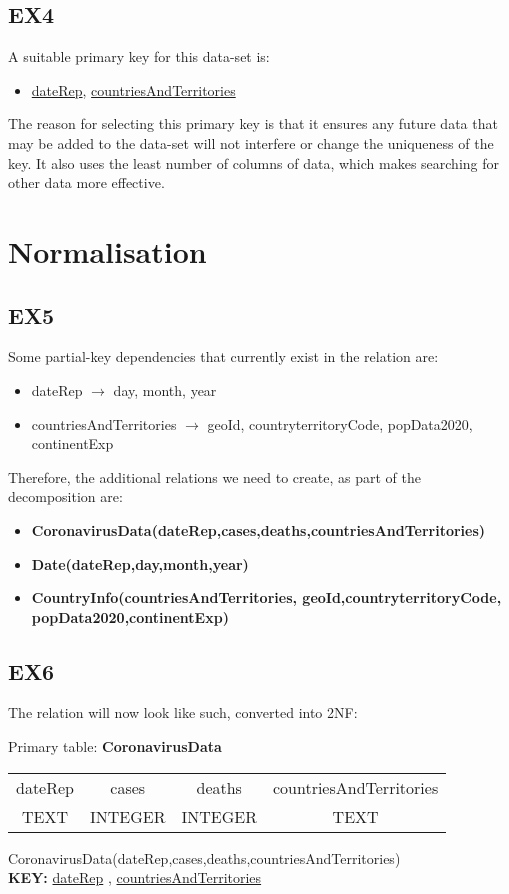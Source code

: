 \documentclass[10pt]{article}
\begin{document}
\subsection{EX4}
A suitable primary key for this data-set is:
\begin{itemize}
    \item \underline{dateRep}, \underline{countriesAndTerritories}  %
\end{itemize}
The reason for selecting this primary key is that it ensures any future data that may be added to the data-set will not interfere or change the uniqueness of the key. It also uses the least number of columns of data, which makes searching for other data more effective.

\section{Normalisation}
\subsection{EX5}
Some partial-key dependencies that currently exist in the relation are:
\begin{itemize}
    \item dateRep $\rightarrow$ day, month, year
    \item countriesAndTerritories $\rightarrow$ geoId, countryterritoryCode, popData2020, continentExp
\end{itemize}
Therefore, the additional relations we need to create, as part of the decomposition are:
\begin{itemize}
    \item \textbf{CoronavirusData(dateRep,cases,deaths,countriesAndTerritories)}
    \item \textbf{Date(dateRep,day,month,year)}
    \item \textbf{CountryInfo(countriesAndTerritories, geoId,countryterritoryCode,\\popData2020,continentExp)}
\end{itemize}

\subsection{EX6}
The relation will now look like such, converted into 2NF:
\begin{center}
    Primary table: \textbf{CoronavirusData}
    \begin{adjustbox}{width=300pt,center}
    \begin{tabular}{ |c|c|c|c| } 
    \hline
    dateRep & cases & deaths & countriesAndTerritories\\
    TEXT & INTEGER & INTEGER & TEXT\\
    \hline
    \end{tabular}
    \end{adjustbox}
    CoronavirusData(dateRep,cases,deaths,countriesAndTerritories)\\
    \textbf{KEY: } \underline{dateRep} , \underline{countriesAndTerritories}
\end{center}
\end{document}
